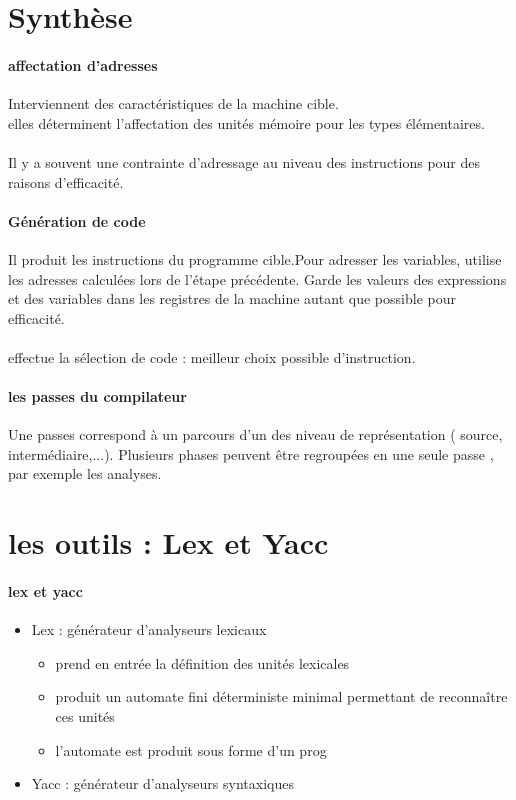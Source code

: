 \documentclass{article}
\begin{document}
\section{Synthèse}
\paragraph{affectation d'adresses}
Interviennent des caractéristiques de la machine cible.\\ elles déterminent l'affectation des unités mémoire pour les types élémentaires.\\\\Il y a souvent une contrainte d'adressage au niveau des instructions pour des raisons d'efficacité.
\paragraph{Génération de code}Il produit les instructions du programme cible.Pour adresser les variables, utilise les adresses calculées lors de l'étape précédente. Garde les valeurs des expressions et des variables dans les registres de la machine autant que possible pour efficacité.\\\\effectue la sélection de code : meilleur choix possible d'instruction.

\paragraph{les passes du compilateur}
Une passes correspond à un parcours d'un des niveau de représentation ( source, intermédiaire,...). Plusieurs phases peuvent être regroupées en une seule passe , par exemple les analyses.
\newpage
\section{les outils : Lex et Yacc}
\paragraph{lex et yacc}
\begin{itemize}
\item Lex : générateur d'analyseurs lexicaux
\begin{itemize}
 \item prend en entrée la définition des unités lexicales
 \item produit un automate fini déterministe minimal permettant de reconnaître ces unités
 \item l'automate est produit sous forme d'un prog 
\end{itemize}
\item Yacc : générateur d'analyseurs syntaxiques
\end{itemize}
\end{document}
